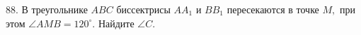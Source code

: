 88. В треугольнике $ABC$ биссектрисы $AA_1$ и $BB_1$ пересекаются в точке $M,$ при этом $\angle AMB=120^\circ.$ Найдите $\angle C.$\\
